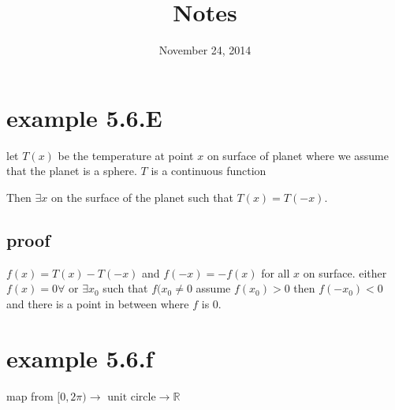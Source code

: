 \documentclass[letterpaper]{article}
\begin{document}
\title{Notes}
\date{November 24, 2014}
\maketitle
\section*{example 5.6.E}
let $T(x)$ be the temperature at point $x$ on surface of planet where we assume that the planet is a sphere. $T$ is a continuous function

Then $\exists x$ on the surface of the planet such that $T(x)=T(-x)$.
\subsection*{proof}
$f(x)=T(x)-T(-x)$ and $f(-x)=-f(x)$ for all $x$ on surface. either $f(x)=0\forall $ or $\exists x_0$ such that $f(x_0\ne0$ assume $f(x_0)>0$ then $f(-x_0)<0$ and there is a point in between where $f$ is 0.

\section*{example 5.6.f}
map from $[0,2\pi)\to\text{ unit circle}\to \mathbb{R}$
\end{document}

